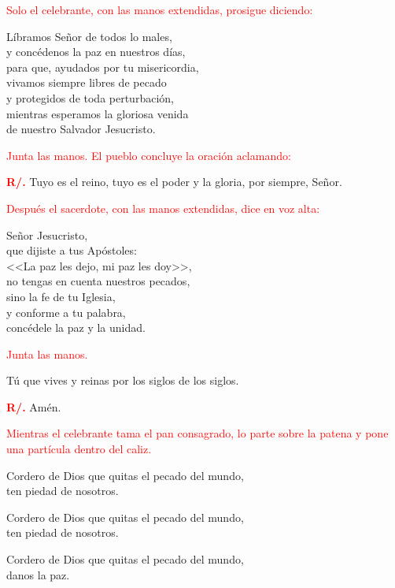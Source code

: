\documentclass[12pt, letterpaper]{report}
\begin{document}
\large{\textcolor{red}{Solo el celebrante, con las manos extendidas, prosigue diciendo:}}

\noindent
\Large L\'ibramos Se\~nor de todos lo males,\\ 
y conc\'edenos la paz en nuestros d\'ias,\\ 
para que, ayudados por tu misericordia,\\ 
vivamos siempre libres de pecado\\ 
y protegidos de toda perturbaci\'on,\\ 
mientras esperamos la gloriosa venida\\ 
de nuestro Salvador Jesucristo.

\large{\textcolor{red}{Junta las manos. El pueblo concluye la oraci\'on aclamando:}}

\noindent
\Large {\bfseries \textcolor{red}{R/.}} \hspace{0.5cm} Tuyo es el reino, tuyo es el poder y la gloria, por siempre, Se\~nor.

\large{\textcolor{red}{Despu\'es el sacerdote, con las manos extendidas, dice en voz alta:}}

\noindent
\Large Se\~nor Jesucristo,\\ 
que dijiste a tus Ap\'ostoles:\\ 
<<La paz les dejo, mi paz les doy>>,\\ 
no tengas en cuenta nuestros pecados,\\ 
sino la fe de tu Iglesia,\\ 
y conforme a tu palabra,\\ 
conc\'edele la paz y la unidad.

\large{\textcolor{red}{Junta las manos.}}

\Large T\'u que vives y reinas por los siglos de los siglos.

\noindent
\Large {\bfseries \textcolor{red}{R/.}} \hspace{0.5cm} Am\'en.

\large{\textcolor{red}{Mientras el celebrante tama el pan consagrado, lo parte sobre la patena y pone una part\'icula dentro del caliz.}}

\noindent
\Large Cordero de Dios que quitas el pecado del mundo,\\
ten piedad de nosotros.

\noindent
\Large Cordero de Dios que quitas el pecado del mundo,\\ 
ten piedad de nosotros.

\noindent
\Large Cordero de Dios que quitas el pecado del mundo,\\ 
danos la paz.
\end{document}
